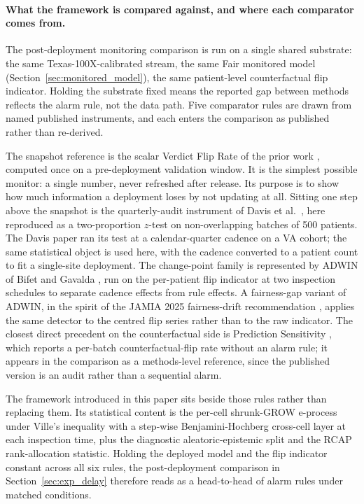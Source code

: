 \documentclass[acmsmall,nonacm,review,anonymous]{acmart}
\newcommand{\1}[1]{\mathbf{1}\!\left\{#1\right\}}
\begin{document}
\paragraph{What the framework is compared against, and where each comparator comes from.}
The post-deployment monitoring comparison is run on a single shared substrate: the same Texas-100X-calibrated stream, the same Fair monitored model (Section~\ref{sec:monitored_model}), the same patient-level counterfactual flip indicator. Holding the substrate fixed means the reported gap between methods reflects the alarm rule, not the data path. Five comparator rules are drawn from named published instruments, and each enters the comparison as published rather than re-derived.

The snapshot reference is the scalar Verdict Flip Rate of the prior work \cite{joy2025vfr}, computed once on a pre-deployment validation window. It is the simplest possible monitor: a single number, never refreshed after release. Its purpose is to show how much information a deployment loses by not updating at all. Sitting one step above the snapshot is the quarterly-audit instrument of Davis et al.\ \cite{davis2025}, here reproduced as a two-proportion $z$-test on non-overlapping batches of 500 patients. The Davis paper ran its test at a calendar-quarter cadence on a VA cohort; the same statistical object is used here, with the cadence converted to a patient count to fit a single-site deployment. The change-point family is represented by ADWIN of Bifet and Gavalda \cite{bifet2007}, run on the per-patient flip indicator at two inspection schedules to separate cadence effects from rule effects. A fairness-gap variant of ADWIN, in the spirit of the JAMIA 2025 fairness-drift recommendation \cite{davis2025}, applies the same detector to the centred flip series rather than to the raw indicator. The closest direct precedent on the counterfactual side is Prediction Sensitivity \cite{maughan2022}, which reports a per-batch counterfactual-flip rate without an alarm rule; it appears in the comparison as a methods-level reference, since the published version is an audit rather than a sequential alarm.

The framework introduced in this paper sits beside those rules rather than replacing them. Its statistical content is the per-cell shrunk-GROW e-process under Ville's inequality with a step-wise Benjamini-Hochberg cross-cell layer at each inspection time, plus the diagnostic aleatoric-epistemic split and the RCAP rank-allocation statistic. Holding the deployed model and the flip indicator constant across all six rules, the post-deployment comparison in Section~\ref{sec:exp_delay} therefore reads as a head-to-head of alarm rules under matched conditions.
\end{document}
